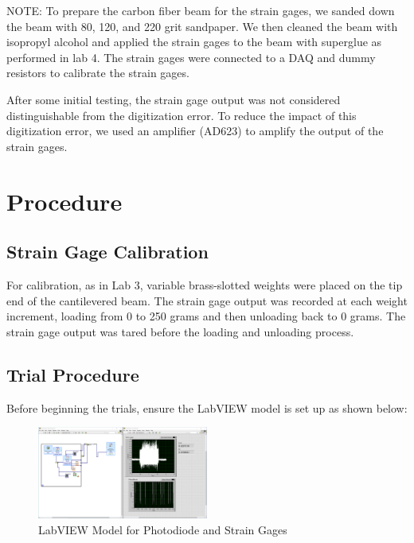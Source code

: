 \documentclass{article}
\begin{document}
NOTE: To prepare the carbon fiber beam for the strain gages, we sanded down the beam with 80, 120, and 220 grit sandpaper. We then cleaned the beam with isopropyl alcohol and applied the strain gages to the beam with superglue as performed in lab 4. The strain gages were connected to a DAQ and dummy resistors to calibrate the strain gages.
\vspace{1mm}

After some initial testing, the strain gage output was not considered distinguishable from the digitization error. To reduce the impact of this digitization error, we used an amplifier (AD623) to amplify the output of the strain gages.  

\section{Procedure}

\subsection{Strain Gage Calibration}

For calibration, as in Lab 3, variable brass-slotted weights were placed on the tip end of the cantilevered beam. The strain gage output was recorded at each weight increment, loading from 0 to 250 grams and then unloading back to 0 grams. The strain gage output was tared before the loading and unloading process.

\subsection{Trial Procedure}
Before beginning the trials, ensure the LabVIEW model is set up as shown below:

\begin{figure}[H]
  \centering
  \includegraphics[width = 0.5\textwidth]{finalprojectimages/labviewfinalprojectmodel.PNG}
  \caption{LabVIEW Model for Photodiode and Strain Gages}
  \label{fig:labviewsetupfinal}
\end{figure}
\end{document}

